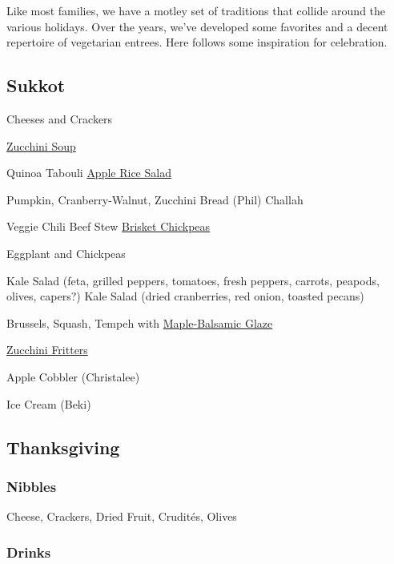 Like most families, we have a motley set of traditions that collide around the various holidays. Over the years, we've developed some favorites and a decent repertoire of vegetarian entrees. Here follows some inspiration for celebration.

\begin{centering}
 \subsection*{Sukkot}

 Cheeses and Crackers

 \hyperref[Zucchini Rosemary Soup]{Zucchini Soup}

 Quinoa Tabouli \blt \hyperref[Apple Rice Salad]{Apple Rice Salad}

 Pumpkin, Cranberry-Walnut, Zucchini Bread (Phil) \blt Challah

 Veggie Chili \blt Beef Stew \blt \href{https://smittenkitchen.com/2020/09/tangy-braised-chickpeas/}{Brisket Chickpeas}

 Eggplant and Chickpeas

 Kale Salad (feta, grilled peppers, tomatoes, fresh peppers, carrots, peapods, olives, capers?) \blt Kale Salad (dried cranberries, red onion, toasted pecans)

 Brussels, Squash, Tempeh with \href{http://www.seriouseats.com/recipes/2012/11/roasted-brussels-sprouts-bacon-pecans-maple-balsamic-recipe.html}{Maple-Balsamic Glaze}

 \href{https://smittenkitchen.com/2011/08/zucchini-fritters/}{Zucchini Fritters}

 Apple Cobbler (Christalee)

 Ice Cream (Beki)

 \pagebreak
 \subsection*{Thanksgiving}

 \subsubsection*{Nibbles}

 Cheese, Crackers, Dried Fruit, Crudités, Olives

 \subsubsection*{Drinks}


\end{centering}
